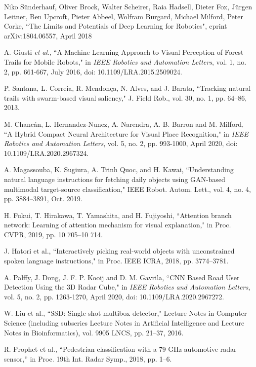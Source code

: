 \documentclass[letterpaper,12pt]{article}
\begin{document}
\begin{thebibliography}{99}
\bibitem{} Niko Sünderhauf, Oliver Brock, Walter Scheirer, Raia Hadsell,
Dieter Fox, Jürgen Leitner, Ben Upcroft, Pieter Abbeel, Wolfram Burgard,
Michael Milford, Peter Corke, ``The Limits and Potentials of Deep
Learning for Robotics", eprint arXiv:1804.06557, April 2018

\bibitem{} A. Giusti \emph{et al}., ``A Machine Learning Approach to Visual
Perception of Forest Trails for Mobile Robots," in \emph{IEEE Robotics
	and Automation Letters}, vol. 1, no. 2, pp. 661-667, July 2016, doi:
10.1109/LRA.2015.2509024.

\bibitem{} P. Santana, L. Correia, R. Mendonça, N. Alves, and J. Barata,
``Tracking natural trails with swarm-based visual saliency," J. Field
Rob., vol. 30, no. 1, pp. 64--86, 2013.

\bibitem{} M. Chancán, L. Hernandez-Nunez, A. Narendra, A. B. Barron and M.
Milford, ``A Hybrid Compact Neural Architecture for Visual Place
Recognition," in \emph{IEEE Robotics and Automation Letters}, vol. 5,
no. 2, pp. 993-1000, April 2020, doi: 10.1109/LRA.2020.2967324.

\bibitem{} A. Magassouba, K. Sugiura, A. Trinh Quoc, and H. Kawai,
``Understanding natural language instructions for fetching daily objects
using GAN-based multimodal target-source classification," IEEE Robot.
Autom. Lett., vol. 4, no. 4, pp. 3884--3891, Oct. 2019.

\bibitem{} H. Fukui, T. Hirakawa, T. Yamashita, and H. Fujiyoshi,
``Attention branch network: Learning of attention mechanism for visual
explanation," in Proc. CVPR, 2019, pp. 10 705--10 714.

\bibitem{} J. Hatori et al., ``Interactively picking real-world objects with
unconstrained spoken language instructions," in Proc. IEEE ICRA, 2018,
pp. 3774--3781.

\bibitem{} A. Palffy, J. Dong, J. F. P. Kooij and D. M. Gavrila, ``CNN Based
Road User Detection Using the 3D Radar Cube," in \emph{IEEE Robotics and
	Automation Letters}, vol. 5, no. 2, pp. 1263-1270, April 2020, doi:
10.1109/LRA.2020.2967272.

\bibitem{} W. Liu et al., ``SSD: Single shot multibox detector," Lecture
Notes in Computer Science (including subseries Lecture Notes in
Artificial Intelligence and Lecture Notes in Bioinformatics), vol. 9905
LNCS, pp. 21--37, 2016.

\bibitem{} R. Prophet et al., ``Pedestrian classification with a 79 GHz
automotive radar sensor,'' in Proc. 19th Int. Radar Symp., 2018, pp.
1--6.


\end{thebibliography}
\end{document}

